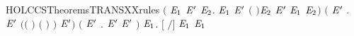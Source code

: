 \begin{SaveVerbatim}{HOLCCSTheoremsTRANSXXrules}
   \ensuremath{(}\HOLSymConst{\HOLTokenForall{}}  \ensuremath{\HOLBoundVar{E}\sb{\mathrm{1}}} \ensuremath{\HOLBoundVar{E}\sp{\prime{}}} \ensuremath{\HOLBoundVar{E}\sb{\mathrm{2}}}.
       \HOLTokenTransBegin{} \HOLTokenTransEnd \ensuremath{\HOLBoundVar{E}\sb{\mathrm{1}}} \HOLSymConst{\HOLTokenConj{}} \ensuremath{\HOLBoundVar{E}\sp{\prime{}}} \HOLTokenTransBegin{} \ensuremath{(} \ensuremath{)}\HOLTokenTransEnd \ensuremath{\HOLBoundVar{E}\sb{\mathrm{2}}} \HOLSymConst{\HOLTokenImp{}}
       \HOLSymConst{\ensuremath{\mid}} \ensuremath{\HOLBoundVar{E}\sp{\prime{}}} \HOLTokenTransBegin\HOLConst{\ensuremath{\tau}}\HOLTokenTransEnd \ensuremath{\HOLBoundVar{E}\sb{\mathrm{1}}} \HOLSymConst{\ensuremath{\mid}} \ensuremath{\HOLBoundVar{E}\sb{\mathrm{2}}}\ensuremath{)} \HOLSymConst{\HOLTokenConj{}}
   \ensuremath{(}\HOLSymConst{\HOLTokenForall{}}  \ensuremath{\HOLBoundVar{E}\sp{\prime{}}}  .
       \HOLTokenTransBegin{}\HOLTokenTransEnd \ensuremath{\HOLBoundVar{E}\sp{\prime{}}} \HOLSymConst{\HOLTokenConj{}} \ensuremath{(}\ensuremath{(} \HOLSymConst{\ensuremath{=}} \HOLConst{\ensuremath{\tau}}\ensuremath{)} \HOLSymConst{\HOLTokenDisj{}} \ensuremath{(} \HOLSymConst{\ensuremath{=}}  \ensuremath{)} \HOLSymConst{\HOLTokenConj{}}  \HOLConst{\HOLTokenNotIn{}}  \HOLSymConst{\HOLTokenConj{}}   \HOLConst{\HOLTokenNotIn{}} \ensuremath{)} \HOLSymConst{\HOLTokenImp{}}
         \HOLTokenTransBegin{}\HOLTokenTransEnd {}  \ensuremath{\HOLBoundVar{E}\sp{\prime{}}}\ensuremath{)} \HOLSymConst{\HOLTokenConj{}}
   \ensuremath{(}\HOLSymConst{\HOLTokenForall{}}  \ensuremath{\HOLBoundVar{E}\sp{\prime{}}} .  \HOLTokenTransBegin{}\HOLTokenTransEnd \ensuremath{\HOLBoundVar{E}\sp{\prime{}}} \HOLSymConst{\HOLTokenImp{}}    \HOLTokenTransBegin{}  \HOLTokenTransEnd {} \ensuremath{\HOLBoundVar{E}\sp{\prime{}}} \ensuremath{)} \HOLSymConst{\HOLTokenConj{}}
   \HOLSymConst{\HOLTokenForall{}}   \ensuremath{\HOLBoundVar{E}\sb{\mathrm{1}}}. \ensuremath{[}  \ensuremath{/}\ensuremath{]}  \HOLTokenTransBegin{}\HOLTokenTransEnd \ensuremath{\HOLBoundVar{E}\sb{\mathrm{1}}} \HOLSymConst{\HOLTokenImp{}}    \HOLTokenTransBegin{}\HOLTokenTransEnd \ensuremath{\HOLBoundVar{E}\sb{\mathrm{1}}}
\end{SaveVerbatim}
